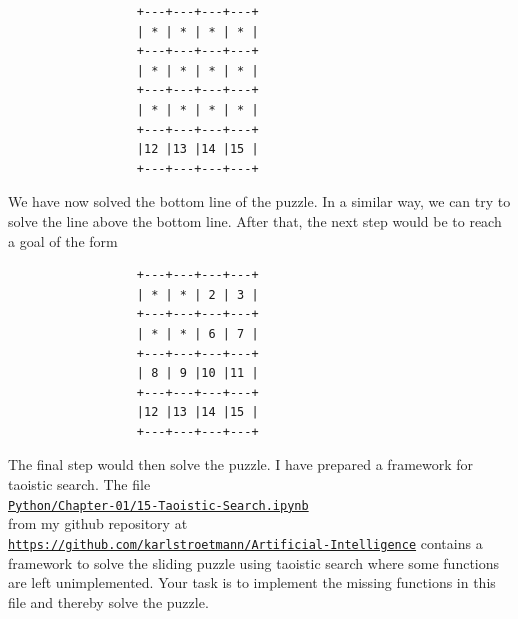  \begin{verbatim}
                  +---+---+---+---+
                  | * | * | * | * |
                  +---+---+---+---+
                  | * | * | * | * |
                  +---+---+---+---+
                  | * | * | * | * |
                  +---+---+---+---+
                  |12 |13 |14 |15 |
                  +---+---+---+---+
 \end{verbatim}
 We have now solved the bottom line of the puzzle.  In a similar way, we can try to solve the line above the
 bottom line.  After that, the next step would be to reach a goal of the form
 \begin{verbatim}
                  +---+---+---+---+
                  | * | * | 2 | 3 |
                  +---+---+---+---+
                  | * | * | 6 | 7 |
                  +---+---+---+---+
                  | 8 | 9 |10 |11 |
                  +---+---+---+---+
                  |12 |13 |14 |15 |
                  +---+---+---+---+
\end{verbatim}
The final step would then solve the puzzle.  I have prepared a framework for taoistic search.  The file
\\[0.2cm]
\hspace*{1.5cm}
\href{https://github.com/karlstroetmann/Artificial-Intelligence/blob/master/Python/Chapter-01/15-Taoistic-Search.ipynb}{\texttt{Python/Chapter-01/15-Taoistic-Search.ipynb}}
\\[0.2cm]
from my github repository at
\href{https://github.com/karlstroetmann/Artificial-Intelligence/}{\texttt{https://github.com/karlstroetmann/Artificial-Intelligence}} \linebreak
contains a framework to solve the sliding puzzle using taoistic search where some functions are left unimplemented.  
 Your task is to implement the missing functions in this file and thereby solve the puzzle.
 \eox

